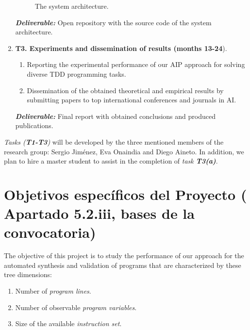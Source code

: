 \documentclass[10pt,a4paper]{paper}
\begin{document}
\begin{enumerate}
\begin{figure}[hbt!]
\begin{center}
\end{center}  
\caption{\small The system architecture.}
\label{fig:architecture}
\end{figure}

{\small{\bf\em Deliverable:} Open repository with the source code of the system architecture.}
    
\item {\bf T3. Experiments and dissemination of results (months 13-24}).
   \begin{small}
      \begin{enumerate}
      \item Reporting the experimental performance of our AIP approach for solving diverse TDD programming tasks.
      \item Dissemination of the obtained theoretical and empirical results by submitting papers to top international conferences and journals in AI.        
      \end{enumerate}
\end{small}        
{\small{\bf\em  Deliverable:} Final report with obtained conclusions and produced publications.}
\end{enumerate}

{\em Tasks ({\bf T1-T3})} will be developed by the three mentioned members of the research group: Sergio Jiménez, Eva Onaindia and Diego Aineto. In addition, we plan to hire a master student to assist in the completion of {\em task {\bf T3(a)}}.


\newpage
\section{Objetivos específicos del Proyecto ( Apartado 5.2.iii, bases de la convocatoria)}
\label{subsec:objectivos}

The objective of this project is to study the performance of our approach for the automated synthesis and validation of programs that are characterized by these tree dimensions:
\begin{enumerate}
\item Number of {\em program lines}.
\item Number of observable {\em program variables}.
\item Size of the available {\em instruction set}.
\end{enumerate}  
\end{document}
